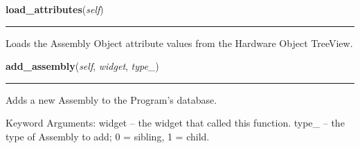     \label{reliafree:assembly:Assembly:load_attributes}

    \vspace{0.5ex}

\hspace{.8\funcindent}\begin{boxedminipage}{\funcwidth}

    \raggedright \textbf{load\_attributes}(\textit{self})

    \vspace{-1.5ex}

    \rule{\textwidth}{0.5\fboxrule}
\setlength{\parskip}{2ex}
    Loads the Assembly Object attribute values from the Hardware Object 
    TreeView.

\setlength{\parskip}{1ex}
    \end{boxedminipage}

    \label{reliafree:assembly:Assembly:add_assembly}

    \vspace{0.5ex}

\hspace{.8\funcindent}\begin{boxedminipage}{\funcwidth}

    \raggedright \textbf{add\_assembly}(\textit{self}, \textit{widget}, \textit{type\_})

    \vspace{-1.5ex}

    \rule{\textwidth}{0.5\fboxrule}
\setlength{\parskip}{2ex}
    Adds a new Assembly to the Program's database.

    Keyword Arguments: widget -- the widget that called this function. 
    type\_  -- the type of Assembly to add; 0 = sibling, 1 = child.

\setlength{\parskip}{1ex}
    \end{boxedminipage}

    \label{reliafree:assembly:Assembly:delete_assembly}


